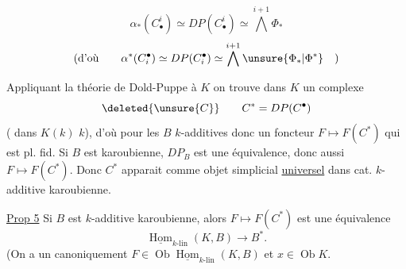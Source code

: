 \[
\alpha_*(C_\bullet^i)\simeq DP(C_\bullet^i)\simeq\bigwedge^{i+1}\Phi_*
\]
\[
(\text{d'où}\qquad \alpha^*(C_i^\bullet)\simeq DP(C_i^\bullet)\simeq\bigwedge^{i+1}\unsure{\Phi_*|\Phi^*}\quad)
\]

Appliquant la théorie de Dold-Puppe à $K$
 on trouve dans $K$ un complexe
\[
\deleted{\unsure{C}}\qquad C^*=DP(C^\bullet)
\]
(   dans  $K(k)$ 
 $k$), d'où pour les $B$ $k$-additives
donc un foncteur $F\longmapsto F(C^*)$ qui est pl. fid.
Si $B$ est karoubienne, $DP_B$ est une équivalence,
donc aussi $F\longmapsto F(C^*)$. Donc
$C^*$ apparait comme objet simplicial \uline{universel}
dans cat. $k$-additive karoubienne.

\uline{Prop 5} Si $B$ est $k$-additive karoubienne, alors
$F\longmapsto F(C^*)$ est une équivalence
\[
\underline{\operatorname{Hom}}_{k\text{-lin}}(K,B)\longrightarrow B^*.
\]
(On a un  canoniquement 
$F\in\operatorname{Ob}\underline{\operatorname{Hom}}_{k\text{-lin}}(K,B)$ et $x\in\operatorname{Ob}K$.

